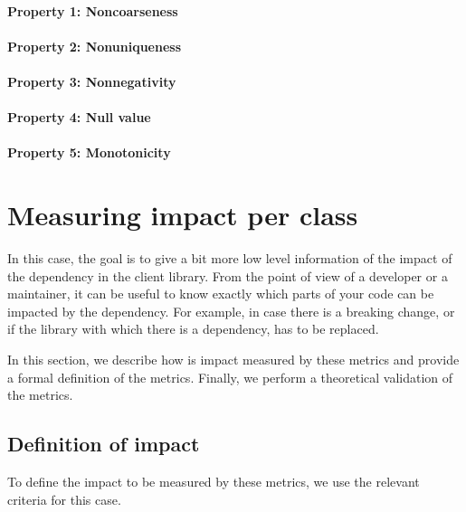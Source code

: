 \paragraph{Property 1: Noncoarseness}

\paragraph{Property 2: Nonuniqueness}

\paragraph{Property 3: Nonnegativity}

\paragraph{Property 4: Null value}

\paragraph{Property 5: Monotonicity}

\section{Measuring impact per class}

In this case, the goal is to give a bit more low level information of the impact of the dependency in the client library. From the point of view of a developer or a maintainer, it can be useful to know exactly which parts of your code can be impacted by the dependency. For example, in case there is a breaking change, or if the library with which there is a dependency, has to be replaced.

In this section, we describe how is impact measured by these metrics and provide a formal definition of the metrics. Finally, we perform a theoretical validation of the metrics.

\subsection{Definition of impact}
To define the impact to be measured by these metrics, we use the relevant criteria for this case.

